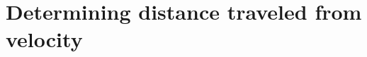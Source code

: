 \section{Determining distance traveled from velocity} \label{S:4.1.VelocityDistance}



\newpage



\newpage



\newpage



\newpage

\clearpage

